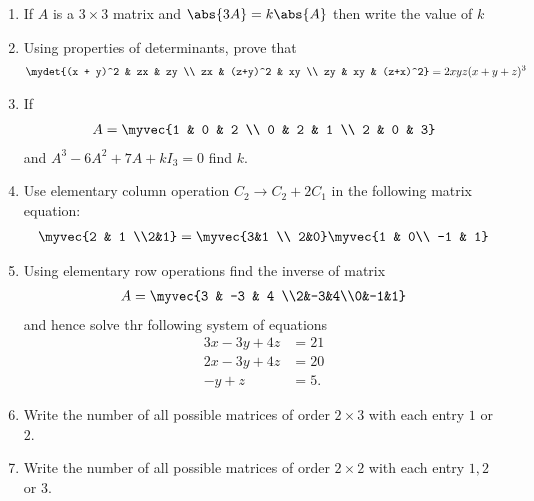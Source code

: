 \begin{enumerate}
    \item If $A$ is a $3\times3$ matrix and $\abs{3A} = k \abs{A}$ then write the value of $k$

    \item Using properties of determinants, prove that
          \begin{align*}
              \mydet{(x + y)^2 & zx      & zy       \\
              zx               & (z+y)^2 & xy       \\
              zy               & xy      & (z+x)^2}
              = 2xyz (x + y + z)^3
          \end{align*}

    \item If
          \begin{align*}
              A = \myvec{1 & 0 & 2  \\
              0            & 2 & 1  \\
              2            & 0 & 3}
          \end{align*}
          and $A^3-6A^2+7A+kI_3=0$ find $k$.
    \item Use elementary column operation $C_2 \rightarrow C_2 + 2C_1$ in the following matrix equation:
          \begin{align*}
              \myvec{2 & 1 \\2&1} = \myvec{3&1 \\ 2&0} \myvec{1 & 0\\ -1 & 1}
          \end{align*}
    \item Using elementary row operations find the inverse of matrix
          \begin{align*}
              A =\myvec{3 & -3 & 4 \\2&-3&4\\0&-1&1}
          \end{align*}
          and hence solve thr following system of equations
          \begin{align*}
              3x-3y+4z & =21 \\
              2x-3y+4z & =20 \\
              -y+z     & =5.
          \end{align*}
    \item Write the number of all possible matrices of order $2\times 3$ with each entry $1$ or $2$.
    \item Write the number of all possible matrices of order $2\times2$ with each entry $1,2$ or $3$.

\end{enumerate}
